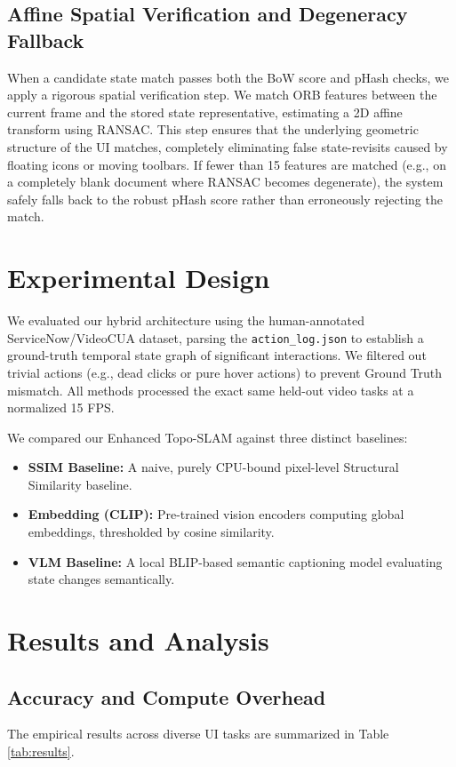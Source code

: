 \documentclass[journal]{IEEEtran}
\begin{document}
\subsection{Affine Spatial Verification and Degeneracy Fallback}
When a candidate state match passes both the BoW score and pHash checks, we apply a rigorous spatial verification step. We match ORB features between the current frame and the stored state representative, estimating a 2D affine transform using RANSAC. This step ensures that the underlying geometric structure of the UI matches, completely eliminating false state-revisits caused by floating icons or moving toolbars. If fewer than 15 features are matched (e.g., on a completely blank document where RANSAC becomes degenerate), the system safely falls back to the robust pHash score rather than erroneously rejecting the match.

\section{Experimental Design}

We evaluated our hybrid architecture using the human-annotated ServiceNow/VideoCUA dataset, parsing the \texttt{action\_log.json} to establish a ground-truth temporal state graph of significant interactions. We filtered out trivial actions (e.g., dead clicks or pure hover actions) to prevent Ground Truth mismatch. All methods processed the exact same held-out video tasks at a normalized 15 FPS.

We compared our Enhanced Topo-SLAM against three distinct baselines:
\begin{itemize}
    \item \textbf{SSIM Baseline:} A naive, purely CPU-bound pixel-level Structural Similarity baseline.
    \item \textbf{Embedding (CLIP):} Pre-trained vision encoders computing global embeddings, thresholded by cosine similarity.
    \item \textbf{VLM Baseline:} A local BLIP-based semantic captioning model evaluating state changes semantically.
\end{itemize}

\section{Results and Analysis}

\subsection{Accuracy and Compute Overhead}
The empirical results across diverse UI tasks are summarized in Table \ref{tab:results}.
\end{document}
